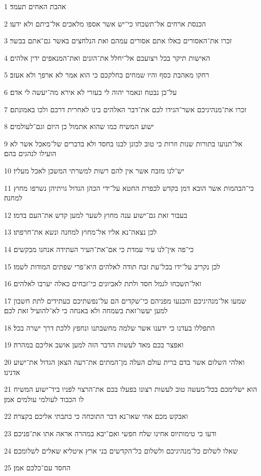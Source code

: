 \par 1 אהבת האחים תעמד׃
\par 2 הכנסת ארחים אל־תשכחו כי־יש אשר אספו מלאכים אל־ביתם ולא ידעו׃
\par 3 זכרו את־האסורים כאלו אתם אסורים עמהם ואת הנלחצים באשר גם־אתם בבשר׃
\par 4 האישות תיקר בכל ויצועכם אל־יחלל את־הזנים ואת־המנאפים ידין אלהים׃
\par 5 רחקו מאהבת כסף והיו שמחים בחלקכם כי הוא אמר לא ארפך ולא אעזב׃
\par 6 על־כן נבטח ונאמר יהוה לי בעזרי לא אירא מה־יעשה לי אדם׃
\par 7 זכרו את־מנהיגיכם אשר־הגידו לכם את־דבר האלהים בינו לאחרית דרכם ולכו באמונתם׃
\par 8 ישוע המשיח כמו שהוא אתמול כן היום וגם־לעולמים׃
\par 9 אל־תנועו בתורות שנות וזרות כי טוב לכונן לבנו בחסד ולא בדברים של־מאכל אשר לא הועילו לנהגים בהם׃
\par 10 יש־לנו מזבח אשר אין להם רשות למשרתי המשכן לאכל מעליו׃
\par 11 כי־הבהמות אשר הובא דמן בקדש לכפרת החטא על־ידי הכהן הגדול גויתיהן נשרפו מחוץ למחנה׃
\par 12 בעבור זאת גם־ישוע ענה מחוץ לשער למען קדש את־העם בדמו׃
\par 13 לכן נצאה־נא אליו אל־מחוץ למחנה ונשא את־חרפתו׃
\par 14 כי־פה אין־לנו עיר עמדת כי אם־את־העיר העתידה אנחנו מבקשים׃
\par 15 לכן נקריב על־ידו בכל־עת זבח תודה לאלהים היא־פרי שפתים המודות לשמו׃
\par 16 ואל־תשכחו לגמל חסד ולתת לאביונים כי־זבחים כאלה יערבו לאלהים׃
\par 17 שמעו אל־מנהיגיכם והכנעו מפניהם כי־שקדים הם על־נפשתיכם כעתידים לתת חשבון למען יעשו־זאת בשמחה ולא באנחה כי לא־להועיל זאת לכם׃
\par 18 התפללו בעדנו כי ידענו אשר שלמה מחשבתנו ונחפץ ללכת דרך ישרה בכל׃
\par 19 ואפצר בכם מאד לעשות הדבר הזה למען אושב אליכם במהרה׃
\par 20 ואלהי השלום אשר בדם ברית עולם העלה מן־המתים את־רעה הצאן הגדול את־ישוע אדנינו׃
\par 21 הוא ישלימכם בכל־מעשה טוב לעשות רצונו בפעלו בכם את־הרצוי לפניו ביד־ישוע המשיח לו הכבוד לעולמי עולמים אמן׃
\par 22 ואבקש מכם אחי שאו־נא דבר התוכחה כי כתבתי אליכם בקצרה׃
\par 23 ודעו כי טימותיוס אחינו שלח חפשי ואם־יבא במהרה אראה אתו את־פניכם׃
\par 24 שאלו לשלום כל־מנהיגיכם ולשלום כל־הקדשים בני ארץ איטליא שאלים לשלומכם׃
\par 25 החסד עם־כלכם אמן׃


